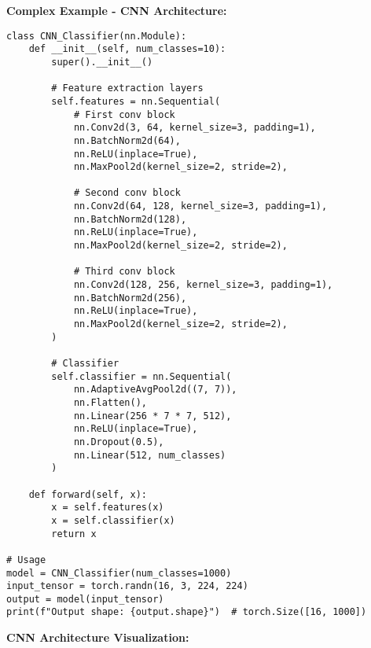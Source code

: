 \documentclass[11pt,a4paper]{book}
\begin{document}
\textbf{Complex Example - CNN Architecture:}
\begin{verbatim}
class CNN_Classifier(nn.Module):
    def __init__(self, num_classes=10):
        super().__init__()
        
        # Feature extraction layers
        self.features = nn.Sequential(
            # First conv block
            nn.Conv2d(3, 64, kernel_size=3, padding=1),
            nn.BatchNorm2d(64),
            nn.ReLU(inplace=True),
            nn.MaxPool2d(kernel_size=2, stride=2),
            
            # Second conv block
            nn.Conv2d(64, 128, kernel_size=3, padding=1),
            nn.BatchNorm2d(128),
            nn.ReLU(inplace=True),
            nn.MaxPool2d(kernel_size=2, stride=2),
            
            # Third conv block
            nn.Conv2d(128, 256, kernel_size=3, padding=1),
            nn.BatchNorm2d(256),
            nn.ReLU(inplace=True),
            nn.MaxPool2d(kernel_size=2, stride=2),
        )
        
        # Classifier
        self.classifier = nn.Sequential(
            nn.AdaptiveAvgPool2d((7, 7)),
            nn.Flatten(),
            nn.Linear(256 * 7 * 7, 512),
            nn.ReLU(inplace=True),
            nn.Dropout(0.5),
            nn.Linear(512, num_classes)
        )
    
    def forward(self, x):
        x = self.features(x)
        x = self.classifier(x)
        return x

# Usage
model = CNN_Classifier(num_classes=1000)
input_tensor = torch.randn(16, 3, 224, 224)
output = model(input_tensor)
print(f"Output shape: {output.shape}")  # torch.Size([16, 1000])
\end{verbatim}

\textbf{CNN Architecture Visualization:}
\end{document}

